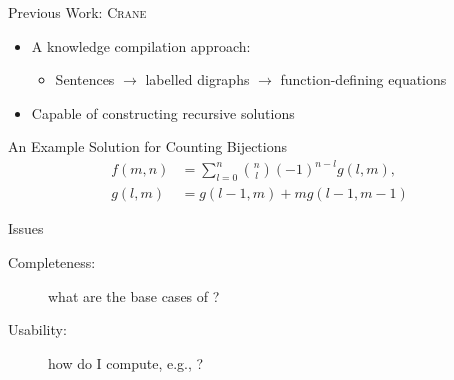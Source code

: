 \documentclass{beamer}
\begin{document}
\begin{frame}{Previous Work:
    \textsc{Crane}~}
  \begin{itemize}
    \item A knowledge compilation approach:
          \begin{itemize}
            \item \alert{Sentences} $\to$ labelled \alert{digraphs} $\to$
                  function-defining \alert{equations}
          \end{itemize}
    \item Capable of constructing recursive solutions
  \end{itemize}
  \pause
  \begin{exampleblock}{An Example Solution for Counting Bijections}
    \begin{align*}
      f(m, n) &= \sum_{l=0}^{n} \binom{n}{l}{(-1)}^{n-l}g(l, m),\\
      g(l, m) &= g(l-1, m) + mg(l-1, m-1)
    \end{align*}
  \end{exampleblock}
  \pause
  \begin{alertblock}{Issues}
    \begin{description}
      \item[Completeness:] what are the base cases of ?
      \item[Usability:] how do I compute, e.g., ?
    \end{description}
  \end{alertblock}
\end{frame}



\end{document}
